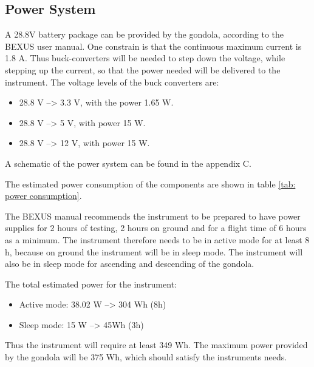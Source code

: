 \pagebreak
\subsection{Power System}
A 28.8V battery package can be provided by the gondola, according to the BEXUS user manual. One constrain is that the continuous maximum current is 1.8 A. Thus buck-converters will be needed to step down the voltage, while stepping up the current, so that the power needed will be delivered to the instrument. The voltage levels of the buck converters are: 

\begin{itemize}
	\item 28.8 V --> 3.3 V, with the power 1.65 W.
	\item 28.8 V --> 5 V, with power 15 W.
	\item 28.8 V --> 12 V, with power 15 W.
\end{itemize}

A schematic of the power system can be found in the appendix C.

The estimated power consumption of the components are shown in table \ref{tab: power consumption}. 


\newpage

The BEXUS manual recommends the instrument to be prepared to have power supplies for 2 hours of testing, 2 hours on ground and for a flight time of 6 hours as a minimum. The instrument therefore needs to be in active mode for at least 8 h, because on ground the instrument will be in sleep mode. The instrument will also be in sleep mode for ascending and descending of the gondola. 

The total estimated power for the instrument:

\begin{itemize}
    \item Active mode: 38.02 W  --> 304 Wh (8h)
    \item Sleep mode: 15 W --> 45Wh (3h) 
\end{itemize}

Thus the instrument will require at least 349 Wh. The maximum power provided by the gondola will be 375 Wh, which should satisfy the instruments needs.




\raggedbottom
